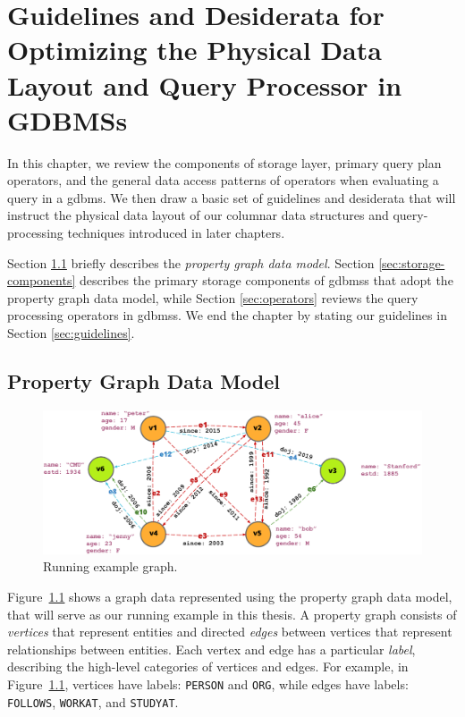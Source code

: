 \chapter{Guidelines and Desiderata for Optimizing the Physical Data Layout and Query Processor in GDBMSs}
\label{c:guidelines}

In this chapter, we review the components of storage layer, primary query plan operators, and the general data access patterns of operators when evaluating a query in a \gls{gdbms}. We then draw a basic set of guidelines and desiderata that will instruct the physical data layout of our columnar data structures and query-processing techniques introduced in later chapters.

Section \ref{sec:property-graph-data-model} briefly describes the \emph{property graph data model}. Section \ref{sec:storage-components} describes the primary storage components of \gls{gdbms}s that adopt the property graph data model, while Section \ref{sec:operators} reviews the query processing operators in \gls{gdbms}s. We end the chapter by stating our guidelines in Section \ref{sec:guidelines}.

\section{Property Graph Data Model}
\label{sec:property-graph-data-model}

\begin{figure}
	\includegraphics[scale=0.86]{img/property-graph}
	\vspace{-8pt}
	\caption{Running example graph.}
	\label{fig:runn}
	\vspace{-8pt}
\end{figure}

Figure~\ref{fig:runn} shows a graph data represented using the property graph data model, that will serve as our running example in this thesis. A property graph consists of \emph{vertices} that represent entities and directed \emph{edges} between vertices that represent relationships between entities. Each vertex and edge has a particular \emph{label}, describing the high-level categories of vertices and edges. For example, in Figure~\ref{fig:runn}, vertices have labels: \texttt{PERSON} and \texttt{ORG}, while edges have labels: \texttt{FOLLOWS}, \texttt{WORKAT}, and \texttt{STUDYAT}.

